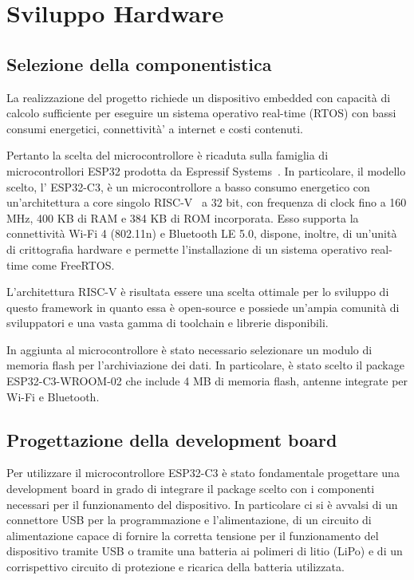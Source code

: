 \chapter{Sviluppo Hardware}

\section{Selezione della componentistica}

La realizzazione del progetto richiede un dispositivo embedded con capacità di calcolo sufficiente per eseguire un 
sistema operativo real-time (RTOS) con bassi consumi energetici, connettività' a internet e costi contenuti.

Pertanto la scelta del microcontrollore è ricaduta sulla famiglia di microcontrollori ESP32 prodotta da Espressif Systems~\cite{espressif_website}.
In particolare, il modello scelto, l' ESP32-C3, è un microcontrollore a basso consumo energetico con un'architettura
a core singolo RISC-V~\cite{riscv} a 32 bit, con frequenza di clock fino a 160 MHz, 400 KB di RAM e 384 KB di ROM incorporata.
Esso supporta la connettività Wi-Fi 4 (802.11n) e Bluetooth LE 5.0, dispone, inoltre, di un'unità di crittografia hardware e permette
l'installazione di un sistema operativo real-time come FreeRTOS.

L'architettura RISC-V è risultata essere una scelta ottimale per lo sviluppo di questo framework in quanto
essa è open-source e possiede un'ampia comunità di sviluppatori e una vasta gamma di toolchain e librerie disponibili.

In aggiunta al microcontrollore è stato necessario selezionare un modulo di memoria flash per l'archiviazione dei dati. In 
particolare, è stato scelto il package ESP32-C3-WROOM-02 che include 4 MB di memoria flash, antenne integrate per Wi-Fi e Bluetooth.

\section{Progettazione della development board}

Per utilizzare il microcontrollore ESP32-C3 è stato fondamentale progettare una development board in grado di integrare il package scelto
con i componenti necessari per il funzionamento del dispositivo. In particolare ci si è avvalsi di un connettore USB per la programmazione e l'alimentazione,
di un circuito di alimentazione capace di fornire la corretta tensione per il funzionamento del dispositivo tramite USB o tramite una batteria
ai polimeri di litio (LiPo) e di un corrispettivo circuito di protezione e ricarica della batteria utilizzata.

